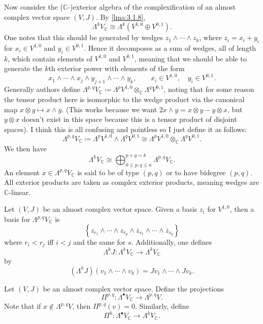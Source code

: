 \begin{discussion}\label{discussion:3.1.13}
	Now consider the ($\mathbb{C} $-)exterior algebra of the complexification of an almost complex vector space $(V,J)$. By \cref{lma:3.1.8},
	\[
		\Lambda ^kV_\mathbb{C}  \cong \Lambda ^k \left(V^{1,0} \oplus V^{0,1} \right)
	.\]
	One notes that this should be generated by wedges $z_1 \wedge \cdots \wedge z_k$, where $z_i = x_i + y_i$ for $x_i\in V^{1,0} $ and $y_i\in V^{0,1} $. Hence it decomposes as a sum of wedges, all of length $k$, which contain elements of $V^{1,0} $ and $V^{0,1} $, meaning that we should be able to generate the $k$th exterior power with elements of the form
	\[
		x_1 \wedge \cdots \wedge x_j \wedge y_{j+1} \wedge \cdots \wedge y_{k} ,\qquad x_i\in V^{1,0} ,\quad y_i\in V^{0,1} .
	\]
	Generally authors define $\Lambda ^{p,q} V_\mathbb{C} \coloneqq \Lambda ^pV^{1,0} \otimes _\mathbb{C} \Lambda ^qV^{0,1} $, noting that for some reason the tensor product here is isomorphic to the wedge product via the canonical map $x\otimes y\mapsto x\wedge y$. (This works because we want $2x\wedge y = x\otimes y - y\otimes x$, but $y\otimes x$ doesn't exist in this space because this is a tensor product of disjoint spaces). I think this is all confusing and pointless so I just define it as follows:
	\[
		\Lambda ^{p,q} V_\mathbb{C} \coloneqq \Lambda ^pV^{1,0} \wedge \Lambda ^qV^{0,1} \cong \Lambda ^pV^{1,0} \otimes _\mathbb{C} \Lambda ^qV^{0,1} 
	.\]
	We then have
	\[
		\Lambda ^kV_\mathbb{C} \cong \bigoplus_{0\leq p,q\leq n} ^{p+q=k} \Lambda ^{p,q} V_\mathbb{C} 
	.\]
	An element $x\in \Lambda ^{p,q} V_\mathbb{C} $ is said to be of type $(p,q)$ or to have bidegree $(p,q)$. All exterior products are taken as complex exterior products, meaning wedges are $\mathbb{C} $-linear.
\end{discussion}

\begin{remark}\label{rmk:3.1.14}
Let $(V,J)$ be an almost complex vector space. Given a basis $z_i$ for $V^{1,0} $, then a basis for $\Lambda ^{p,q} V_\mathbb{C} $ is
\[
	\left\{ z_{r_1} \wedge \cdots \wedge z_{r_p} \wedge \overline{z}_{s_1} \wedge \cdots \wedge \overline{z} _{s_q}  \right\}
\]
where $r_i < r_j$ iff $i<j$ and the same for $s$. Additionally, one defines
\[
	\Lambda ^kJ : \Lambda ^kV_\mathbb{C}  \to \Lambda ^kV_\mathbb{C} 
\]
by
\[
	(\Lambda ^kJ)(v_1\wedge \cdots \wedge v_k)=Jv_1 \wedge \cdots \wedge Jv_k
.\]
\end{remark}

\begin{definition}\label{dfn:3.1.15}
	Let $(V,J)$ be an almost complex vector space. Define the projections
	\[
		\Pi ^{p,q} : \Lambda ^{\bullet} V_\mathbb{C}  \to \Lambda ^{p,q} V
	.\]
	Note that if $x \notin \Lambda ^{p,q} V$, then $\Pi ^{p,q} (v)=0$. Similarly, define
	\[
		\Pi ^k : \Lambda ^{\bullet} V_\mathbb{C}  \to \Lambda ^kV_\mathbb{C} 
	.\]
\end{definition}


